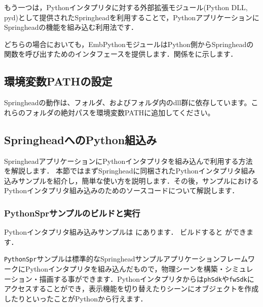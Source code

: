\KLUDGE もう一つは，Python\KLUDGE インタプリタに対する外部拡張モジュール(Python DLL, pyd)\KLUDGE として提供されたSpringhead\KLUDGE を利用することで，Python\KLUDGE アプリケーションにSpringhead\KLUDGE の機能を組み込む利用法です．

\KLUDGE どちらの場合においても，EmbPython\KLUDGE モジュールはPython\KLUDGE 側からSpringhead\KLUDGE の関数を呼び出すためのインタフェースを提供します．関係を\KLUDGE に示します．

\begin{fig}
\end{fig}

\subsection{\KLUDGE 環境変数PATH\KLUDGE の設定}

Springhead\KLUDGE の動作は、\KLUDGE フォルダ、および\KLUDGE フォルダ内のdll\KLUDGE 群に依存しています。これらのフォルダの絶対パスを環境変数PATH\KLUDGE に追加してください。


\subsection*{Springhead\KLUDGE へのPython\KLUDGE 組込み}

Springhead\KLUDGE アプリケーションにPython\KLUDGE インタプリタを組み込んで利用する方法を解説します．
\KLUDGE 本節ではまずSpringhead\KLUDGE に同梱されたPython\KLUDGE インタプリタ組み込みサンプルを紹介し，簡単な使い方を説明します．その後，サンプルにおけるPython\KLUDGE インタプリタ組み込みのためのソースコードについて解説します．

\subsubsection*{PythonSpr\KLUDGE サンプルのビルドと実行}

Python\KLUDGE インタプリタ組み込みサンプルは  \KLUDGE にあります．
\KLUDGE ビルドすると  \KLUDGE ができます．

\texttt{PythonSpr}\KLUDGE サンプルは標準的なSpringhead\KLUDGE サンプルアプリケーションフレームワークにPython\KLUDGE インタプリタを組み込んだもので，物理シーンを構築・シミュレーション・描画する事ができます．Python\KLUDGE インタプリタからは\texttt{phSdk}\KLUDGE や\texttt{fwSdk}\KLUDGE にアクセスすることができ，表示機能を切り替えたりシーンにオブジェクトを作成したりといったことがPython\KLUDGE から行えます．

